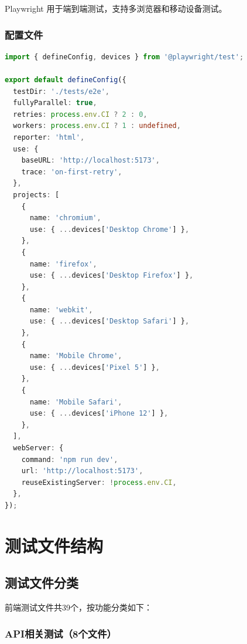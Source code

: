 \documentclass[12pt,a4paper,openany]{report}
\begin{document}
Playwright 用于端到端测试，支持多浏览器和移动设备测试。

\subsubsection{配置文件}

\begin{lstlisting}[language=TypeScript, caption=playwright.config.ts]
import { defineConfig, devices } from '@playwright/test';

export default defineConfig({
  testDir: './tests/e2e',
  fullyParallel: true,
  retries: process.env.CI ? 2 : 0,
  workers: process.env.CI ? 1 : undefined,
  reporter: 'html',
  use: {
    baseURL: 'http://localhost:5173',
    trace: 'on-first-retry',
  },
  projects: [
    {
      name: 'chromium',
      use: { ...devices['Desktop Chrome'] },
    },
    {
      name: 'firefox',
      use: { ...devices['Desktop Firefox'] },
    },
    {
      name: 'webkit',
      use: { ...devices['Desktop Safari'] },
    },
    {
      name: 'Mobile Chrome',
      use: { ...devices['Pixel 5'] },
    },
    {
      name: 'Mobile Safari',
      use: { ...devices['iPhone 12'] },
    },
  ],
  webServer: {
    command: 'npm run dev',
    url: 'http://localhost:5173',
    reuseExistingServer: !process.env.CI,
  },
});
\end{lstlisting}

\section{测试文件结构}

\subsection{测试文件分类}

前端测试文件共39个，按功能分类如下：

\subsubsection{API相关测试（8个文件）}
\end{document}
